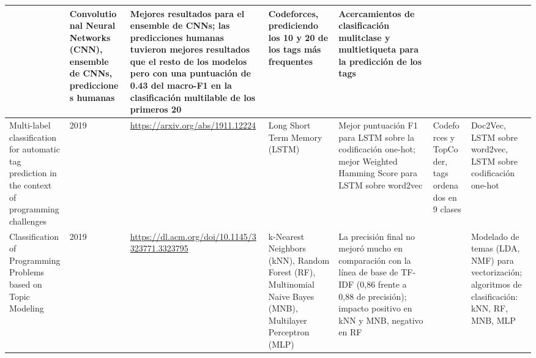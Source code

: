 \documentclass{article}
\begin{document}
\begin{itemize}
\begin{longtable}{|p{2cm}|p{0.8cm}|p{2cm}|p{2cm}|p{3cm}|p{2cm}|p{3cm}|}
              
                             & Convolutional Neural Networks (CNN), ensemble de CNNs, predicciones humanas
                             & Mejores resultados para el ensemble de CNNs; las predicciones humanas tuvieron mejores resultados que el resto de los modelos pero con una puntuación de 0.43 del macro-F1 en la clasificación multilable de los primeros 20 
                             & Codeforces, prediciendo los 10 y 20 de los tags más frequentes
                             & Acercamientos de clasificación mulitclase y multietiqueta para la predicción de los tags                                                                                                                                                                       \\
              
              \hline
              Multi-label classification for automatic tag prediction in the context of programming challenges
                             & 2019
                             & \href{https://arxiv.org/abs/1911.12224}{\url{https://arxiv.org/abs/1911.12224}}

              
              
              
              
              
                             & Long Short Term Memory (LSTM)
                             & Mejor puntuación F1 para LSTM sobre la codificación one-hot; mejor Weighted Hamming Score para LSTM sobre word2vec
                             & Codeforces y TopCoder, tags ordenados en 9 clases
                             & Doc2Vec, LSTM sobre word2vec, LSTM sobre codificación one-hot                                                                                                                                                                                                \\
              
              \hline
              Classification of Programming Problems based on Topic Modeling
                             & 2019
                             & \href{https://dl.acm.org/doi/10.1145/3323771.3323795}{\url{https://dl.acm.org/doi/10.1145/3323771.3323795}}

              
              
              
              
              
                             & k-Nearest Neighbors (kNN), Random Forest (RF), Multinomial Naive Bayes (MNB), Multilayer Perceptron (MLP) 
                             & La precisión final no mejoró mucho en comparación con la línea de base de TF-IDF (0,86 frente a 0,88 de precisión); impacto positivo en kNN y MNB, negativo en RF 
                             & 
                             & Modelado de temas (LDA, NMF) para vectorización; algoritmos de clasificación: kNN, RF, MNB, MLP                                                                                                                                                                      \\
              

\end{longtable}
\end{itemize}
\end{document}
